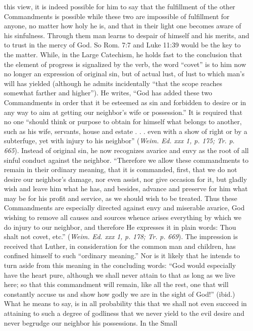 this view, it is indeed possible for him to say that the fulfillment of the other Commandments is possible while these two are impossible of fulfillment for anyone, no matter how holy he is, and that in their light one becomes aware of his sinfulness. Through them man learns to despair of himself and his merits, and to trust in the mercy of God. So Rom. 7:7 and Luke 11:39 would be the key to the matter. While, in the Large Catechism, he holds fast to the conclusion that the element of progress is signalized by the verb, the word “covet” is to him now no longer an expression of original sin, but of actual lust, of lust to which man’s will has yielded (although he admits incidentally “that the scope reaches somewhat farther and higher”). He writes, “God has added these two Commandments in order that it be esteemed as sin and forbidden to desire or in any way to aim at getting our neighbor’s wife or possession.” It is required that no one “should think or purpose to obtain for himself what belongs to another, such as his wife, servants, house and estate . . . even with a show of right or by a subterfuge, yet with injury to his neighbor” (\emph{Weim. Ed. xxx 1, p. 175; Tr. p. 665}). Instead of original sin, he now recognizes avarice and envy as the root of all sinful conduct against the neighbor. “Therefore we allow these commandments to remain in their ordinary meaning, that it is commanded, first, that we do not desire our neighbor’s damage, nor even assist, nor give occasion for it, but gladly wish and leave him what he has, and besides, advance and preserve for him what may be for his profit and service, as we should wish to be treated. Thus these Commandments are especially directed against envy and miserable avarice, God wishing to remove all causes and sources whence arises everything by which we do injury to our neighbor, and therefore He expresses it in plain words: Thou shalt not covet, etc.” (\emph{Weim. Ed. xxx 1, p. 178; Tr. p. 669}). The impression is received that Luther, in consideration for the common man and children, has confined himself to such “ordinary meaning.” Nor is it likely that he intends to turn aside from this meaning in the concluding words: “God would especially have the heart pure, although we shall never attain to that as long as we live here; so that this commandment will remain, like all the rest, one that will constantly accuse us and show how godly we are in the sight of God!” (ibid.) What he means to say, is in all probability this that we shall not even succeed in attaining to such a degree of godliness that we never yield to the evil desire and never begrudge our neighbor his possessions. In the Small
